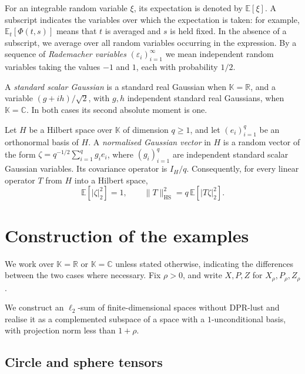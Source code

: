 \documentclass[11pt,a4paper,reqno]{amsart}
\theoremstyle{definition}
\newcommand{\R}{\mathbb R}
\newcommand{\C}{\mathbb C}
\newcommand{\eps}{\varepsilon}
\newcommand{\norm}[1]{\lVert #1\rVert}
\numberwithin{equation}{section}
\begin{document}
For an integrable random variable $\xi$, its expectation is denoted by $\mathbb E[\xi]$. A subscript indicates the variables over which the expectation is taken: for example, $\mathbb E_t[\Phi(t,s)]$ means that $t$ is averaged and $s$ is held fixed. In the absence of a subscript, we average over all random variables occurring in the expression. By a sequence of \emph{Rademacher variables} $(\eps_i)_{i=1}^{\infty}$ we mean independent random variables taking the values $-1$ and $1$, each with probability $1/2$.

A \emph{standard scalar Gaussian} is a standard real Gaussian when $\mathbb K=\R$, and a variable $(g+ih)/\sqrt2$, with $g,h$ independent standard real Gaussians, when $\mathbb K=\C$. In both cases its second absolute moment is one.

Let $H$ be a Hilbert space over $\mathbb K$ of dimension $q\geq1$, and let $(e_i)_{i=1}^q$ be an orthonormal basis of $H$. A \emph{normalised Gaussian vector} in $H$ is a random vector of the form $\zeta=q^{-1/2}\sum_{i=1}^q g_i e_i$, where $(g_i)_{i=1}^q$ are independent standard scalar Gaussian variables. Its covariance operator is $I_H/q$. Consequently, for every linear operator $T$ from $H$ into a Hilbert space,
\begin{equation}\label{eq:gaussian-hs}
 \mathbb E[|\zeta|_2^2]=1,\qquad
 \norm T_{\mathrm{HS}}^2=q\,\mathbb E[|T\zeta|_2^2].
\end{equation}
\section{Construction of the examples}\label{sec:construction}

We work over $\mathbb K=\R$ or $\mathbb K=\C$ unless stated otherwise, indicating the differences between the two cases where necessary. Fix $\rho>0$, and write $X,P,Z$ for $X_\rho,P_\rho,Z_\rho$.

We construct an $\ell_2$-sum of finite-dimensional spaces without DPR-lust and realise it as a complemented subspace of a space with a $1$-unconditional basis, with projection norm less than $1+\rho$.

\subsection{Circle and sphere tensors}\label{sec:tensors}
\end{document}
